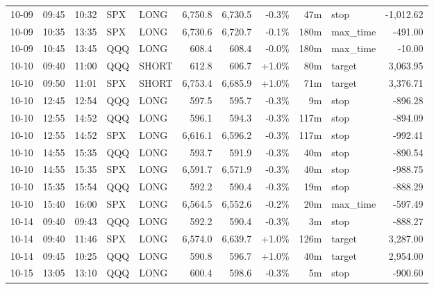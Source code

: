 \documentclass[11pt,a4paper,twoside]{article}
\begin{document}
\begin{center}
\begin{longtable}{>{\color{txtmain}}l l l l l r r r r >{\color{txtmain}}l r}
10-09 & 09:45 & 10:32 & SPX & LONG & 6,750.8 & 6,730.5 & \textcolor{lossred}{-0.3\%} & 47m & stop & \textcolor{lossred}{-1,012.62} \\
10-09 & 10:35 & 13:35 & SPX & LONG & 6,730.6 & 6,720.7 & \textcolor{lossred}{-0.1\%} & 180m & max\_time & \textcolor{lossred}{-491.00} \\
10-09 & 10:45 & 13:45 & QQQ & LONG & 608.4 & 608.4 & \textcolor{lossred}{-0.0\%} & 180m & max\_time & \textcolor{lossred}{-10.00} \\
10-10 & 09:40 & 11:00 & QQQ & SHORT & 612.8 & 606.7 & \textcolor{wingreen}{+1.0\%} & 80m & target & \textcolor{wingreen}{3,063.95} \\
10-10 & 09:50 & 11:01 & SPX & SHORT & 6,753.4 & 6,685.9 & \textcolor{wingreen}{+1.0\%} & 71m & target & \textcolor{wingreen}{3,376.71} \\
10-10 & 12:45 & 12:54 & QQQ & LONG & 597.5 & 595.7 & \textcolor{lossred}{-0.3\%} & 9m & stop & \textcolor{lossred}{-896.28} \\
10-10 & 12:55 & 14:52 & QQQ & LONG & 596.1 & 594.3 & \textcolor{lossred}{-0.3\%} & 117m & stop & \textcolor{lossred}{-894.09} \\
10-10 & 12:55 & 14:52 & SPX & LONG & 6,616.1 & 6,596.2 & \textcolor{lossred}{-0.3\%} & 117m & stop & \textcolor{lossred}{-992.41} \\
10-10 & 14:55 & 15:35 & QQQ & LONG & 593.7 & 591.9 & \textcolor{lossred}{-0.3\%} & 40m & stop & \textcolor{lossred}{-890.54} \\
10-10 & 14:55 & 15:35 & SPX & LONG & 6,591.7 & 6,571.9 & \textcolor{lossred}{-0.3\%} & 40m & stop & \textcolor{lossred}{-988.75} \\
10-10 & 15:35 & 15:54 & QQQ & LONG & 592.2 & 590.4 & \textcolor{lossred}{-0.3\%} & 19m & stop & \textcolor{lossred}{-888.29} \\
10-10 & 15:40 & 16:00 & SPX & LONG & 6,564.5 & 6,552.6 & \textcolor{lossred}{-0.2\%} & 20m & max\_time & \textcolor{lossred}{-597.49} \\
10-14 & 09:40 & 09:43 & QQQ & LONG & 592.2 & 590.4 & \textcolor{lossred}{-0.3\%} & 3m & stop & \textcolor{lossred}{-888.27} \\
10-14 & 09:40 & 11:46 & SPX & LONG & 6,574.0 & 6,639.7 & \textcolor{wingreen}{+1.0\%} & 126m & target & \textcolor{wingreen}{3,287.00} \\
10-14 & 09:45 & 10:25 & QQQ & LONG & 590.8 & 596.7 & \textcolor{wingreen}{+1.0\%} & 40m & target & \textcolor{wingreen}{2,954.00} \\
10-15 & 13:05 & 13:10 & QQQ & LONG & 600.4 & 598.6 & \textcolor{lossred}{-0.3\%} & 5m & stop & \textcolor{lossred}{-900.60} \\

\end{longtable}
\end{center}
\end{document}
